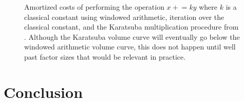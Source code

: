 \documentclass[onecolumn,unpublished]{quantumarticle}
\theoremstyle{definition}
\theoremstyle{definition}
\theoremstyle{definition}
\newcommand{\pluseq}{\mathrel{+}=}
\begin{document}
\begin{figure}
    \centering
    \caption{
        \label{fig:product-add-costs}
        Amortized costs of performing the operation $x \pluseq ky$ where $k$ is a classical constant using windowed arithmetic, iteration over the classical constant, and the Karatsuba multiplication procedure from \cite{gidney2019karatsuba}.
        Although the Karatsuba volume curve will eventually go below the windowed arithmetic volume curve, this does not happen until well past factor sizes that would be relevant in practice.
    }
\end{figure}


\section{Conclusion}
\label{sec:conclusion}
\end{document}
